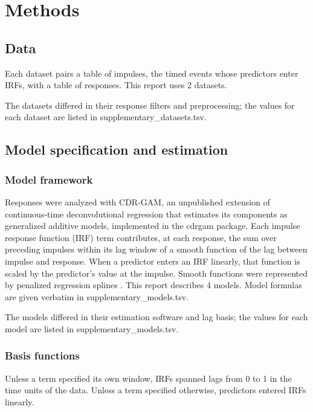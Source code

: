 \section*{Methods}

\subsection*{Data}

Each dataset pairs a table of impulses, the timed events whose predictors enter IRFs, with a table of responses. This report uses 2 datasets.

The datasets differed in their response filters and preprocessing; the values for each dataset are listed in supplementary\_datasets.tsv.

\subsection*{Model specification and estimation}

\subsubsection*{Model framework}

Responses were analyzed with CDR-GAM, an unpublished extension of continuous-time deconvolutional regression \citep{shain2021cdr} that estimates its components as generalized additive models, implemented in the cdrgam package. Each impulse response function (IRF) term contributes, at each response, the sum over preceding impulses within its lag window of a smooth function of the lag between impulse and response. When a predictor enters an IRF linearly, that function is scaled by the predictor's value at the impulse. Smooth functions were represented by penalized regression splines \citep{wood2017generalized}. This report describes 4 models. Model formulas are given verbatim in supplementary\_models.tsv.

The models differed in their estimation software and lag basis; the values for each model are listed in supplementary\_models.tsv.

\subsubsection*{Basis functions}

Unless a term specified its own window, IRFs spanned lags from 0 to 1 in the time units of the data. Unless a term specified otherwise, predictors entered IRFs linearly.

